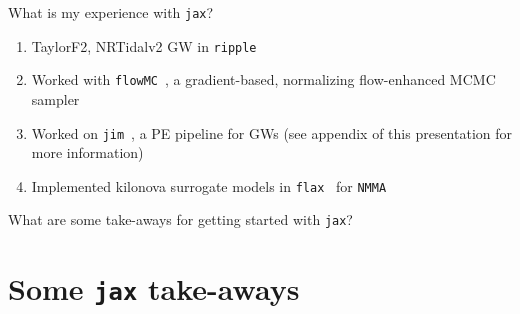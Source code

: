 \documentclass[usenames,dvipsnames,t]{beamer}
\begin{document}
\begin{frame}{What is my experience with \texttt{jax}?}

  \def\x{5mm}

  \begin{enumerate}
    \item TaylorF2, NRTidalv2 GW in \texttt{ripple}~\cite{edwards2023ripple}
    
    \vspace{\x}

    \item Worked with \texttt{flowMC}~\cite{gabrie2021efficient, wong2022flowmc}, a gradient-based, normalizing flow-enhanced MCMC sampler
    
    \vspace{\x}

    \item Worked on \texttt{jim}~\cite{wong2023fast}, a PE pipeline for GWs (see appendix of this presentation for more information)
    
    \vspace{\x}

    \item Implemented kilonova surrogate models in \texttt{flax}~\cite{flax2020github} for \texttt{NMMA}~\cite{pang2022nmma}
  \end{enumerate}

  \vspace{5mm}

  \begin{tcolorbox}[colback=blue!10, boxrule=0pt]
    What are some take-aways for getting started with \texttt{jax}?
  \end{tcolorbox}
  
\end{frame}

\section{Some \texttt{jax} take-aways}
\end{document}
